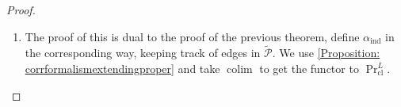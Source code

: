 \documentclass[14pt]{article}
\theoremstyle{definition}
\newcommand{\E}{\mathcal{E}}
\newcommand{\D}{\mathcal{D}}
\renewcommand{\P}{\mathcal{P}}
\newcommand{\op}[1]{\operatorname{#1}}
\renewcommand{\S}{\mathcal{S}}
\newcommand{\dd}{\delta}
\newcommand{\Ca}{\mathcal{C}}
\numberwithin{subsection}{section}
\begin{document}
\begin{proof}
\begin{enumerate}
\begin{enumerate}
 \item  As proven in \cref{Proposition: corrextendedformalismincludingsmooth}, we have map \[\D_{(\Ca,\S,\E)}: \dd^*_{3,\{2,3\}}\Ca^{\op{cart}^*_!}_{\E,\S,\op{all}} \to \op{Pr}^L \] where the maps on the directions of $\E,\S$ and $\op{All}$ go to $(-)_!,(-)^*,(-)^*$ respectively.Applying $\D'$ and taking colimits, we the following map
 \begin{equation}
      \alpha'_{\op{Pro}}:\op{Fun}(K,\delta^*_{3,\{2,3\}}((\Ca^{\op{op}})^{\amalg,\op{cart}})^{\op{cart}^*_!}_{\E,\S,\op{all}}) \xrightarrow{\D_{(\Ca,\S,\E)}} \op{Fun}(K,\op{Pr}^L) \xrightarrow{\op{colim}} \op{Pr}^L_{\op{cl}}.
     \end{equation}
     \item Composing $\alpha_{\op{Pro}}$ and $\alpha'_{\op{Pro}}$, we get our desired functor:
     \begin{equation}
         \D_{\op{pro}}:\op{Corr}(\op{Pro}^K_{\S}(\Ca))_{\op{Adj}^!_!(\E),\op{All}}  \xrightarrow{\alpha_{\op{Pro}}} \op{Fun}(K,\delta^*_{3,\{2,3\}}\Ca^{\op{cart}^*_!}_{\E,\S,\op{all}}) \xrightarrow{\alpha'_{\op{Pro}}} \op{Pr}_{\op{cl}}^L.
     \end{equation}
\end{enumerate}
\item The proof of this is dual to the proof of the previous theorem, define $\alpha_{\op{ind}}$ in the corresponding way, keeping track of edges in $\tilde{\P}$. We use \cref{Proposition: corrformalismextendingproper} and take $\op{colim}$ to get the functor to $\op{Pr}^L_{\op{cl}}$.
    \end{enumerate}
\end{proof}
\end{document}
